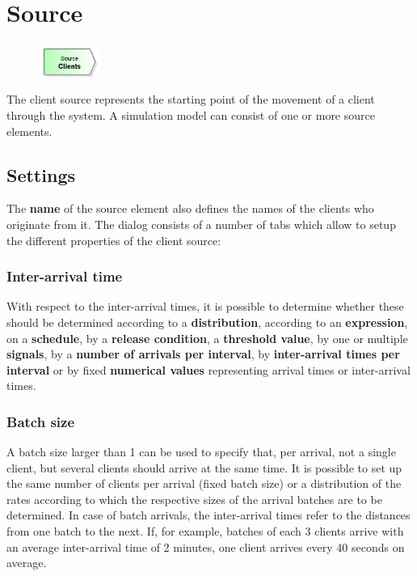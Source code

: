 \section{Source}
\label{ref:ModelElementSource}

\begin{figure}
\vspace{-22pt}
\includegraphics[width=2cm]{imageModelElementSource.png}
\vspace{-22pt}
\end{figure}

The client source represents the starting point of the movement of a client through the system.
A simulation model can consist of one or more source elements.

\subsection*{Settings}

The \textbf{name} of the source element also defines the names of the clients who originate from it.
The dialog consists of a number of tabs which allow to setup the different properties of the client source:

\subsubsection*{Inter-arrival time}

With respect to the inter-arrival times, it is possible to determine whether these
should be determined according to a \textbf{distribution}, according to an \textbf{expression},
on a \textbf{schedule}, by a \textbf{release condition}, a \textbf{threshold value}, by
one or multiple \textbf{signals}, by a \textbf{number of arrivals per interval}, by
\textbf{inter-arrival times per interval} or by fixed \textbf{numerical values}
representing arrival times or inter-arrival times.

\subsubsection*{Batch size}

A batch size larger than 1 can be used to specify that, per arrival, not a single client,
but several clients should arrive at the same time. It is possible to set up the same number
of clients per arrival (fixed batch size) or a distribution of the rates according to which
the respective sizes of the arrival batches are to be determined.
In case of batch arrivals, the inter-arrival times refer to the distances from one batch to the next.
If, for example, batches of each 3 clients arrive with an average inter-arrival time of 2 minutes,
one client arrives every 40 seconds on average.

